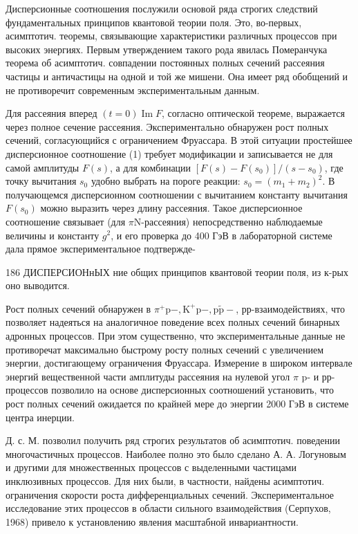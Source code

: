 \documentclass[10pt]{article}
\begin{document}
Дисперсионные соотношения послужили основой ряда строгих следствий фундаментальных принципов квантовой теории поля. Это, во-первых, асимптотич. теоремы, связывающие характеристики различных процессов при высоких энергиях. Первым утверждением такого рода явилась Померанчука теорема об асимптотич. совпадении постоянных полных сечений рассеяния частицы и античастицы на одной и той же мишени. Она имеет ряд обобщений и не противоречит современным экспериментальным данным.



Для рассеяния вперед $(t=0) \operatorname{Im} F$, согласно оптической теореме, выражается через полное сечение рассеяния. Экспериментально обнаружен рост полных сечений, согласующийся с ограничением Фруассара. В этой ситуации простейшее дисперсионное соотношение (1) требует модификации и записывается не для самой амплитуды $F(s)$, а для комбинации $\left[F(s)-F\left(s_{0}\right)\right] /\left(s-s_{0}\right)$, где точку вычитания $s_{0}$ удобно выбрать на пороге реакции: $s_{0}=\left(m_{1}+m_{2}\right)^{2}$. В получающемся дисперсионном соотношении с вычитанием константу вычитания $F\left(s_{0}\right)$ можно выразить через длину рассеяния. Такое дисперсионное соотношение связывает (для $\pi \mathrm{N}$-рассеяния) непосредственно наблюдаемые величины и константу $g^{2}$, и его проверка до 400 ГэВ в лабораторной системе дала прямое экспериментальное подтвержде-



186 ДИСПЕРСИОНнЫХ ние общих принципов квантовой теории поля, из к-рых оно выводится.



Рост полных сечений обнаружен в $\pi^{+} \mathrm{p}-, \mathrm{K}^{+} \mathrm{p}-, \mathrm{p} \tilde{\mathrm{p}}-$, рр-взаимодействиях, что позволяет надеяться на аналогичное поведение всех полных сечений бинарных адронных процессов. При этом существенно, что экспериментальные данные не противоречат максимально быстрому росту полных сечений с увеличением энергии, достигающему ограничения Фруассара. Измерение в широком интервале энергий вещественной части амплитуды рассеяния на нулевой угол $\pi$ p- и рр-процессов позволило на основе дисперсионных соотношений установить, что рост полных сечений ожидается по крайней мере до энергии 2000 ГэВ в системе центра инерции.



Д. с. М. позволил получить ряд строгих результатов об асимптотич. поведении многочастичных процессов. Наиболее полно это было сделано А. А. Логуновым и другими для множественных процессов с выделенными частицами инклюзивных процессов. Для них были, в частности, найдены асимптотич. ограничения скорости роста дифференциальных сечений. Экспериментальное исследование этих процессов в области сильного взаимодействия (Серпухов, 1968) привело к установлению явления масштабной инвариантности.
\end{document}

